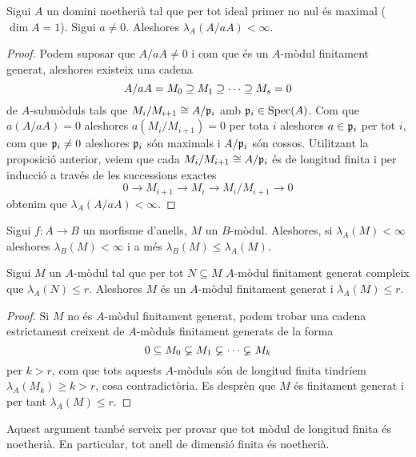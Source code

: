 \documentclass[../../../main.tex]{subfiles}
\begin{document}
\begin{prop}
\label{prop:4410} Sigui $A$ un domini noetherià tal que per tot ideal primer no nul és maximal ($\dim A = 1$). Sigui $a\not=0$. Aleshores $\lambda_A(A/aA)<\infty$.
\end{prop}
\begin{proof}
Podem suposar que $A/aA\neq 0$ i com que és un $A$-mòdul finitament generat, aleshores existeix una cadena
\begin{equation}
    \notag
    A/aA = M_0\supseteq M_1\supseteq \cdots \supseteq M_s = 0
\end{equation}
de $A$-submòduls tals que $M_i/M_{i+1}\cong A/\mathfrak{p}_i$ amb $\mathfrak{p}_i\in \mathrm{Spec}(A)$. Com que $a(A/aA) = 0$ aleshores $a(M_i/M_{i+1})=0$ per tota $i$ aleshores $a\in\mathfrak{p}_i$ per tot $i$, com que $\mathfrak{p}_i \neq 0$ aleshores $\mathfrak{p}_i$ són maximals i $A/\mathfrak{p}_i$ són cossos. Utilitzant la proposició anterior, veiem que cada $M_i/M_{i+1}\cong A/\mathfrak{p}_i$ és de longitud finita i per inducció a través de les successions exactes $$0\to M_{i+1}\to M_i\to M_i/M_{i+1}\to 0$$ obtenim que $\lambda_A(A/aA)<\infty$. 
\end{proof}




\begin{nota}
Sigui $f:A\to B$ un morfisme d'anells, $M$ un $B$-mòdul. Aleshores, si $\lambda_A(M)<\infty$ aleshores $\lambda_B(M)<\infty$ i a més $\lambda_B(M)\leq \lambda_A(M)$.
\end{nota}

\begin{prop}
\label{prop:4412} Sigui $M$ un $A$-mòdul tal que per tot $N\subseteq M$ $A$-mòdul finitament generat compleix que $\lambda_A(N)\leq r$. Aleshores $M$ és un $A$-mòdul finitament generat i $\lambda_A(M)\leq r$.
\end{prop}
\begin{proof}
Si $M$ no és $A$-mòdul finitament generat, podem trobar una cadena estrictament creixent de $A$-mòduls finitament generats de la forma
\begin{equation}
    \notag
    0\subseteq M_0\varsubsetneq M_1\varsubsetneq \cdots\varsubsetneq M_k
\end{equation}
per $k>r$, com que tots aquests $A$-mòduls són de longitud finita tindríem $\lambda_A(M_k)\geq k>r$, cosa contradictòria. Es desprèn que $M$ és finitament generat i per tant $\lambda_A(M)\leq r$. 
\end{proof}

\begin{nota}
Aquest argument també serveix per provar que tot mòdul de longitud finita és noetherià. En particular, tot anell de dimensió finita és noetherià.
\end{nota}
\end{document}
